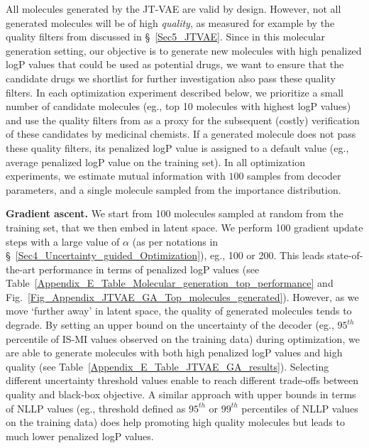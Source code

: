 All molecules generated by the JT-VAE are valid by design. However, not all generated molecules will be of high \emph{quality}, as measured for example by the quality filters from \citet{Brown_2019} discussed in \S~\ref{Sec5_JTVAE}. Since in this molecular generation setting, our objective is to generate new molecules with high penalized logP values that could be used as potential drugs, we want to ensure that the candidate drugs we shortlist for further investigation also pass these quality filters. In each optimization experiment described below, we prioritize a small number of candidate molecules (eg., top 10 molecules with highest logP values) and use the quality filters from \citet{Brown_2019} as a proxy for the subsequent (costly) verification of these candidates by medicinal chemists. If a generated molecule does not pass these quality filters, its penalized logP value is assigned to a default value (eg., average penalized logP value on the training set). In all optimization experiments, we estimate mutual information with $100$ samples from decoder parameters, and a single molecule sampled from the importance distribution.

\label{Appendix_E.4_Molecule_JTVAE_Optimization}
\textbf{Gradient ascent.} We start from 100 molecules sampled at random from the training set, that we then embed in latent space. We perform 100 gradient update steps with a large value of $\alpha$ (as per notations in \S~\ref{Sec4_Uncertainty_guided_Optimization}), eg., 100 or 200. This leads state-of-the-art performance in terms of penalized logP values (see Table~\ref{Appendix_E_Table_Molecular_generation_top_performance} and Fig.~\ref{Fig_Appendix_JTVAE_GA_Top_molecules_generated}). However, as we move `further away' in latent space, the quality of generated molecules tends to degrade.
By setting an upper bound on the uncertainty of the decoder (eg., $95^{th}$ percentile of IS-MI values observed on the training data) during optimization, we are able to generate molecules with both high penalized logP values and high quality (see Table~\ref{Appendix_E_Table_JTVAE_GA_results}). Selecting different uncertainty threshold values enable to reach different trade-offs between quality and black-box objective.
A similar approach with upper bounds in terms of NLLP values (eg., threshold defined as $95^{th}$ or $99^{th}$ percentiles of NLLP values on the training data) does help promoting high quality molecules but leads to much lower penalized logP values.




